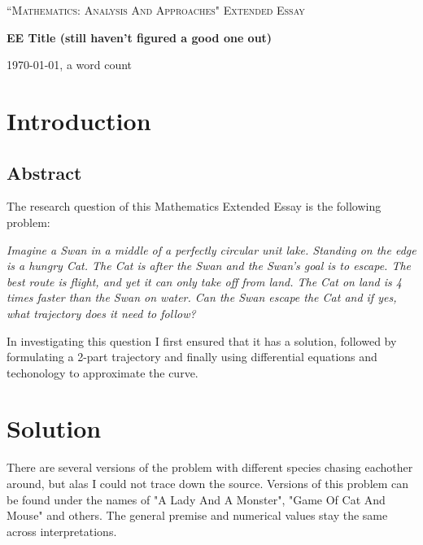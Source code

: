 \documentclass[12pt]{article}
\begin{document}
\begin{titlepage}
	\centering
	\vspace{1cm}
	{\Large \textsc{``Mathematics: Analysis And Approaches" Extended Essay}\par}
	\vspace{1.5cm}
	{\huge\bfseries EE Title (still haven't figured a good one out)\par}
	\vspace{2cm}
	\vfill
	\vfill
	{\large \today, a word count\par}
\end{titlepage}

\clearpage
{}
\tableofcontents
\newpage


\section{Introduction}
\subsection{Abstract}
The research question of this Mathematics Extended Essay is the following problem:

\emph{Imagine a Swan in a middle of a perfectly circular unit lake. Standing on the edge is a hungry Cat. The Cat is after the Swan and the Swan's goal is to escape. The best route is flight, and yet it can only take off from land. The Cat on land is 4 times faster than the Swan on water. Can the Swan escape the Cat and if yes, what trajectory does it need to follow?}

In investigating this question I first ensured that it has a solution, followed by formulating a 2-part trajectory and finally using differential equations and techonology to approximate the curve.

\section{Solution}
There are several versions of the problem with different species chasing eachother around, but alas I could not trace down the source. Versions of this problem can be found under the names of "A Lady And A Monster"\cite{ladyandmonster}, "Game Of Cat And Mouse"\cite{Catandmouse} and others. The general premise and numerical values stay the same across interpretations. 
\end{document}
